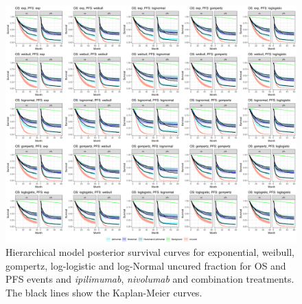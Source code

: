 \documentclass[AMA,STIX1COL]{WileyNJD-v2}
\begin{document}
\begin{figure}
\centering
\includegraphics[width=0.9\linewidth]{plot_S_grid_cf_hier.png}
\caption{\label{fig:S_grid_cf_hier} Hierarchical model posterior survival curves for exponential, weibull, gompertz, log-logistic and log-Normal uncured fraction for OS and PFS events and {\it ipilimumab}, {\it nivolumab} and combination treatments. The black lines show the Kaplan-Meier curves.}
\end{figure}


\end{document}
